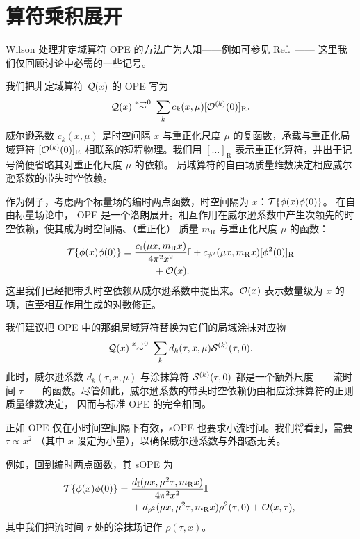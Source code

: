 \section{\label{sec:ope}算符乘积展开}

Wilson 处理非定域算符 OPE 的方法广为人知——例如可参见 Ref.~\cite{Collins:1984rdg}——
这里我们仅回顾讨论中必需的一些记号。

我们把非定域算符 ${\cal Q}(x)$ 的 OPE 写为
\begin{equation}
{\cal Q}(x)  \stackrel{x\rightarrow 0}{\sim} \; \sum_k
c_k(x,\mu) [{\cal O}^{(k)}(0)]_{\mathrm{R}}.
\end{equation}
威尔逊系数 $c_k(x,\mu)$ 是时空间隔 $x$ 与重正化尺度 $\mu$ 的复函数，承载与重正化局域算符
$[{\cal O}^{(k)}(0)]_{\mathrm{R}}$ 相联系的短程物理。我们用
$[\ldots]_{\mathrm{R}}$ 表示重正化算符，并出于记号简便省略其对重正化尺度 $\mu$ 的依赖。
局域算符的自由场质量维数决定相应威尔逊系数的带头时空依赖。

作为例子，考虑两个标量场的编时两点函数，时空间隔为 $x$：${\cal T} \{\phi(x)\phi(0)\}$。
在自由标量场论中，
OPE 是一个洛朗展开。相互作用在威尔逊系数中产生次领先的时空依赖，使其成为时空间隔、（重正化）
质量 $m_{\mathrm{R}}$ 与重正化尺度 $\mu$ 的函数：
\begin{align}\label{eq:opeint}
{\cal T} \{\phi(x)\phi(0)\} = {} & \frac{c_{\mathbb{I}}(\mu
x,m_{\mathrm{R}}x)}{4\pi^2x^2}\mathbb{I}+
c_{\phi^2}(\mu x,m_{\mathrm{R}}x)[\phi^2(0) ]_{\mathrm{R}} \nonumber\\
{} & \qquad
+{\cal O}(x).
\end{align}
这里我们已经把带头时空依赖从威尔逊系数中提出来。${\cal O}(x)$ 表示数量级为 $x$
的项，直至相互作用生成的对数修正。

我们建议把 OPE 中的那组局域算符替换为它们的局域涂抹对应物
\begin{equation}
{\cal Q}(x)  \stackrel{x\rightarrow 0}{\sim} \; \sum_k
d_k(\tau,x,\mu) {\cal S}^{(k)}(\tau,0).
\end{equation}
此时，威尔逊系数 $d_k(\tau,x,\mu)$ 与涂抹算符 ${\cal S}^{(k)}(\tau,0)$ 都是一个额外尺度——流时间
$\tau$——的函数。尽管如此，威尔逊系数的带头时空依赖仍由相应涂抹算符的正则质量维数决定，
因而与标准 OPE 的完全相同。

正如 OPE 仅在小时间空间隔下有效，sOPE 也要求小流时间。我们将看到，需要 $\tau \propto x^2$
（其中 $x$ 设定为小量），以确保威尔逊系数与外部态无关。

例如，回到编时两点函数，其 sOPE 为
\begin{align}\label{eq:sope2pt}
\!\!{\cal T}\{\phi(x)\phi(0)\} ={} &
\frac{d_{\mathbb{I}}(\mu x,\mu^2\tau,m_{\mathrm{R}}x)}{4\pi^2x^2}\mathbb{I}
\nonumber\\
{} & +
d_{\rho^2}(\mu x,\mu^2\tau,m_{\mathrm{R}}x)\rho^2(\tau,0)  +
{\cal O}(x,\tau),
\end{align}
其中我们把流时间 $\tau$ 处的涂抹场记作 $\rho(\tau,x)$。

